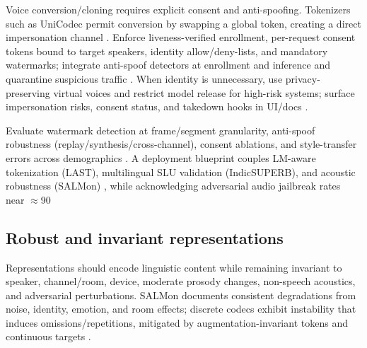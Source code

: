 \documentclass{article}
\begin{document}
Voice conversion/cloning requires explicit consent and anti-spoofing. Tokenizers such as UniCodec permit conversion by swapping a global token, creating a direct impersonation channel \cite{jiang2025universalspeechtokenlearninglowbitratene}. Enforce liveness-verified enrollment, per-request consent tokens bound to target speakers, identity allow/deny-lists, and mandatory watermarks; integrate anti-spoof detectors at enrollment and inference and quarantine suspicious traffic \cite{bai2025dmelspeechtokenizationmadesimple}. When identity is unnecessary, use privacy-preserving virtual voices and restrict model release for high-risk systems; surface impersonation risks, consent status, and takedown hooks in UI/docs \cite{zhao2024advancingspeechlanguagemodelsscalingsupe,park2025longformspeechgenerationspokenlanguagemo,gong2024seamlessexpressivelmspeechlanguagemodele}.

Evaluate watermark detection at frame/segment granularity, anti-spoof robustness (replay/synthesis/cross-channel), consent ablations, and style-transfer errors across demographics \cite{wang2025ssrspeechtowardsstablesaferobustzeroshot,bai2025dmelspeechtokenizationmadesimple,gong2024seamlessexpressivelmspeechlanguagemodele}. A deployment blueprint couples LM-aware tokenization (LAST), multilingual SLU validation (IndicSUPERB), and acoustic robustness (SALMon) \cite{turetzky2024lastlanguagemodelawarespeechtokenization,entry2025indicsuperbspeechprocessinguniversalperf,maimon2025salmonsuiteacousticlanguagemodelevaluati}, while acknowledging adversarial audio jailbreak rates near $\approx$90%

\subsection{Robust and invariant representations} \label{subsec:Robust and invariant representations}
Representations should encode linguistic content while remaining invariant to speaker, channel/room, device, moderate prosody changes, non-speech acoustics, and adversarial perturbations. SALMon documents consistent degradations from noise, identity, emotion, and room effects; discrete codecs exhibit instability that induces omissions/repetitions, mitigated by augmentation-invariant tokens and continuous targets \cite{maimon2025salmonsuiteacousticlanguagemodelevaluati,liu2024analyzingmitigatinginconsistencydiscrete,yuan2024continuousspeechtokensmakesllmsrobustmul,fily2024establishingdegreesclosenessbetweenaudio}.
\end{document}
